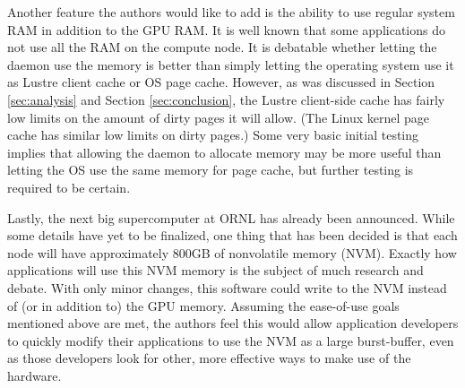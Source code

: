 Another feature the authors would like to add is the ability to use regular system RAM in addition to the GPU RAM.  It is well known that some applications do not use all the RAM on the compute node.  It is debatable whether letting the daemon use the memory is better than simply letting the operating system use it as  Lustre client cache or OS page cache.  However, as was discussed in Section \ref{sec:analysis} and Section \ref{sec:conclusion}, the Lustre client-side cache has fairly low limits on the amount of dirty pages it will allow.  (The Linux kernel page cache has similar low limits on dirty pages.)  Some very basic initial testing implies that allowing the daemon to allocate memory may be more useful than letting the OS use the same memory for page cache, but further testing is required to be certain.

Lastly, the next big supercomputer at ORNL has already been announced.  While some details have yet to be finalized, one thing that has been decided is that each node will have approximately 800GB of nonvolatile memory (NVM).\cite{summit_page}  
Exactly how applications will use this NVM memory is the subject of much research and debate. With only minor changes, this software could write to the NVM instead of (or in addition to) the GPU memory.  Assuming the ease-of-use goals mentioned above are met, the authors feel this would allow application developers to quickly modify their applications to use the NVM as a large burst-buffer, even as those developers look for other, more effective ways to make use of the hardware.


